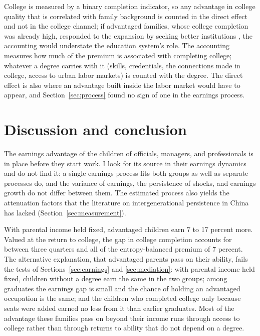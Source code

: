 \documentclass[11pt]{article}
\begin{document}
College is measured by a binary completion indicator, so any advantage in college quality that is correlated with
family background is counted in the direct effect and not in the
college channel; if advantaged families, whose college completion was
already high, responded to the expansion by seeking better institutions \citep{LiuWan2019, LiuYueZhu2025},
the accounting would understate the education system's role. The accounting measures how much of the premium is associated with completing college; whatever a degree carries with it (skills, credentials, the connections made in college, access to urban labor markets) is counted with the degree. The direct effect is also where an advantage built inside the labor market would have to appear, and Section~\ref{sec:process} found no sign of one in the earnings process. 

\section{Discussion and conclusion}
\label{sec:conclusion}

The earnings advantage of the children of officials, managers, and professionals is in place before they start work. I look for its source in their earnings dynamics and do not find it: a single earnings process fits both groups as well as separate processes do, and the variance of earnings, the persistence of shocks, and earnings growth do not differ between them. The estimated process also yields the attenuation factors that the literature on intergenerational persistence in China has lacked (Section~\ref{sec:measurement}).

With parental income held fixed, advantaged children earn 7 to 17 percent more. Valued at the return to college, the gap in college completion accounts for between three quarters and all of the entropy-balanced premium of 7 percent. The alternative explanation, that advantaged parents pass on their ability, fails the tests of Sections~\ref{sec:earnings} and \ref{sec:mediation}: with parental income held fixed, children without a degree earn the same in the two groups; among graduates the earnings gap is small and the chance of holding an advantaged occupation is the same; and the children who completed college only because seats were added earned no less from it than earlier graduates. Most of the advantage these families pass on beyond their income runs through access to college rather than through returns to ability that do not depend on a degree.
\end{document}
